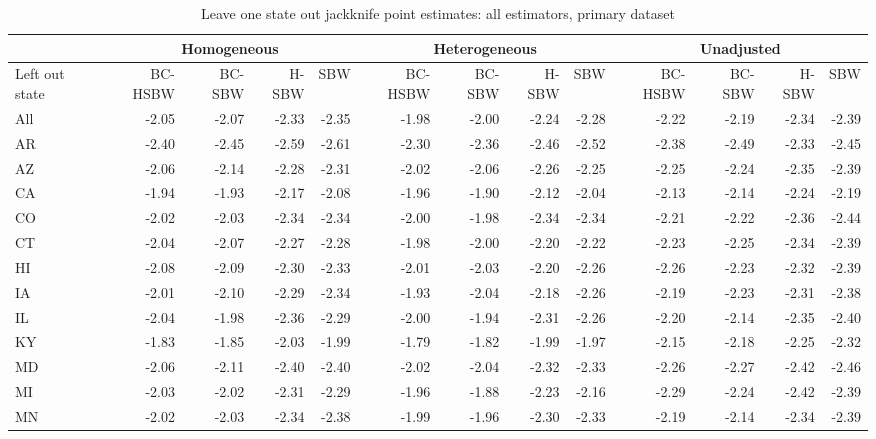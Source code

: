 \newpage

\begin{landscape}

\begin{table}[H]\caption{Leave one state out jackknife point estimates: all estimators, primary dataset}\label{tab:loojackknifec1}
\centering
\begin{tabular}{lrrrr|rrrr|rrrr}
\hline
 & \multicolumn{4}{c}{Homogeneous} & \multicolumn{4}{c}{Heterogeneous} & \multicolumn{4}{c}{Unadjusted} \\ 
 \hline
Left out state & BC-HSBW & BC-SBW & H-SBW & SBW & BC-HSBW & BC-SBW & H-SBW & SBW & BC-HSBW & BC-SBW & H-SBW & SBW \\ 
\hline
All & -2.05 & -2.07 & -2.33 & -2.35 & -1.98 & -2.00 & -2.24 & -2.28 & -2.22 & -2.19 & -2.34 & -2.39 \\ 
AR & -2.40 & -2.45 & -2.59 & -2.61 & -2.30 & -2.36 & -2.46 & -2.52 & -2.38 & -2.49 & -2.33 & -2.45 \\ 
AZ & -2.06 & -2.14 & -2.28 & -2.31 & -2.02 & -2.06 & -2.26 & -2.25 & -2.25 & -2.24 & -2.35 & -2.39 \\ 
CA & -1.94 & -1.93 & -2.17 & -2.08 & -1.96 & -1.90 & -2.12 & -2.04 & -2.13 & -2.14 & -2.24 & -2.19 \\ 
CO & -2.02 & -2.03 & -2.34 & -2.34 & -2.00 & -1.98 & -2.34 & -2.34 & -2.21 & -2.22 & -2.36 & -2.44 \\ 
CT & -2.04 & -2.07 & -2.27 & -2.28 & -1.98 & -2.00 & -2.20 & -2.22 & -2.23 & -2.25 & -2.34 & -2.39 \\ 
HI & -2.08 & -2.09 & -2.30 & -2.33 & -2.01 & -2.03 & -2.20 & -2.26 & -2.26 & -2.23 & -2.32 & -2.39 \\ 
IA & -2.01 & -2.10 & -2.29 & -2.34 & -1.93 & -2.04 & -2.18 & -2.26 & -2.19 & -2.23 & -2.31 & -2.38 \\ 
IL & -2.04 & -1.98 & -2.36 & -2.29 & -2.00 & -1.94 & -2.31 & -2.26 & -2.20 & -2.14 & -2.35 & -2.40 \\ 
KY & -1.83 & -1.85 & -2.03 & -1.99 & -1.79 & -1.82 & -1.99 & -1.97 & -2.15 & -2.18 & -2.25 & -2.32 \\ 
MD & -2.06 & -2.11 & -2.40 & -2.40 & -2.02 & -2.04 & -2.32 & -2.33 & -2.26 & -2.27 & -2.42 & -2.46 \\ 
MI & -2.03 & -2.02 & -2.31 & -2.29 & -1.96 & -1.88 & -2.23 & -2.16 & -2.29 & -2.24 & -2.42 & -2.39 \\ 
MN & -2.02 & -2.03 & -2.34 & -2.38 & -1.99 & -1.96 & -2.30 & -2.33 & -2.19 & -2.14 & -2.34 & -2.39 \\ 

\end{tabular}
\end{table}
\end{landscape}
